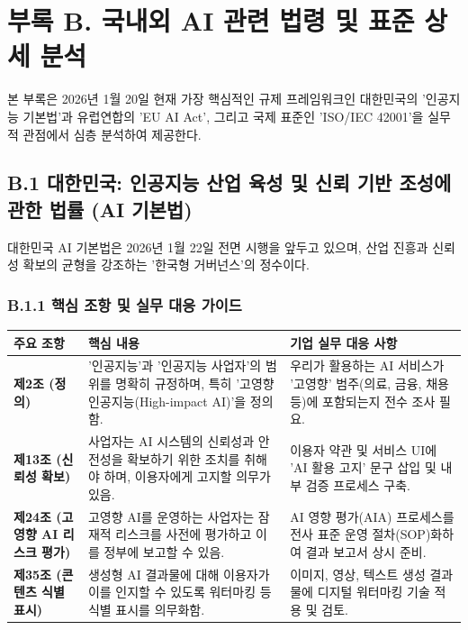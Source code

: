 \chapter*{부록 B. 국내외 AI 관련 법령 및 표준 상세 분석}
\label{ch:appendix_b}

본 부록은 2026년 1월 20일 현재 가장 핵심적인 규제 프레임워크인 대한민국의 '인공지능 기본법'과 유럽연합의 'EU AI Act', 그리고 국제 표준인 'ISO/IEC 42001'을 실무적 관점에서 심층 분석하여 제공한다.

\section*{B.1 대한민국: 인공지능 산업 육성 및 신뢰 기반 조성에 관한 법률 (AI 기본법)}

대한민국 AI 기본법은 2026년 1월 22일 전면 시행을 앞두고 있으며, 산업 진흥과 신뢰성 확보의 균형을 강조하는 '한국형 거버넌스'의 정수이다.

\subsection*{B.1.1 핵심 조항 및 실무 대응 가이드}

\begin{table}[htbp]
\centering
\begin{tabularx}{\textwidth}{p{2.5cm}Xp{4cm}}
\toprule
\textbf{주요 조항} & \textbf{핵심 내용} & \textbf{기업 실무 대응 사항} \\
\midrule
\textbf{제2조 (정의)} & '인공지능'과 '인공지능 사업자'의 범위를 명확히 규정하며, 특히 '고영향 인공지능(High-impact AI)'을 정의함. & 우리가 활용하는 AI 서비스가 '고영향' 범주(의료, 금융, 채용 등)에 포함되는지 전수 조사 필요. \\
\midrule
\textbf{제13조 (신뢰성 확보)} & 사업자는 AI 시스템의 신뢰성과 안전성을 확보하기 위한 조치를 취해야 하며, 이용자에게 고지할 의무가 있음. & 이용자 약관 및 서비스 UI에 'AI 활용 고지' 문구 삽입 및 내부 검증 프로세스 구축. \\
\midrule
\textbf{제24조 (고영향 AI 리스크 평가)} & 고영향 AI를 운영하는 사업자는 잠재적 리스크를 사전에 평가하고 이를 정부에 보고할 수 있음. & AI 영향 평가(AIA) 프로세스를 전사 표준 운영 절차(SOP)화하여 결과 보고서 상시 준비. \\
\midrule
\textbf{제35조 (콘텐츠 식별 표시)} & 생성형 AI 결과물에 대해 이용자가 이를 인지할 수 있도록 워터마킹 등 식별 표시를 의무화함. & 이미지, 영상, 텍스트 생성 결과물에 디지털 워터마킹 기술 적용 및 검토. \\
\bottomrule
\end{tabularx}
\end{table}

